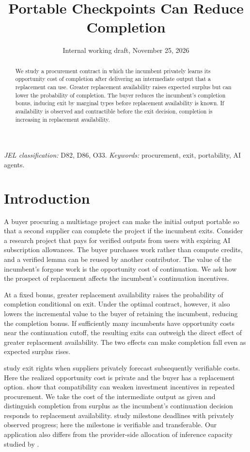 \documentclass[11pt]{article}
\title{Portable Checkpoints Can Reduce Completion}
\author{}
\date{Internal working draft, November 25, 2026}
\begin{document}
\maketitle
\begin{abstract}
We study a procurement contract in which the incumbent privately learns its opportunity cost of completion after delivering an intermediate output that a replacement can use. Greater replacement availability raises expected surplus but can lower the probability of completion. The buyer reduces the incumbent's completion bonus, inducing exit by marginal types before replacement availability is known. If availability is observed and contractible before the exit decision, completion is increasing in replacement availability.
\end{abstract}
\noindent\textit{JEL classification:} D82, D86, O33.\quad
\textit{Keywords:} procurement, exit, portability, AI agents.

\section{Introduction}
A buyer procuring a multistage project can make the initial output portable so that a second supplier can complete the project if the incumbent exits. Consider a research project that pays for verified outputs from users with expiring AI subscription allowances. The buyer purchases work rather than compute credits, and a verified lemma can be reused by another contributor. The value of the incumbent's forgone work is the opportunity cost of continuation. We ask how the prospect of replacement affects the incumbent's continuation incentives.

At a fixed bonus, greater replacement availability raises the probability of completion conditional on exit. Under the optimal contract, however, it also lowers the incremental value to the buyer of retaining the incumbent, reducing the completion bonus. If sufficiently many incumbents have opportunity costs near the continuation cutoff, the resulting exits can outweigh the direct effect of greater replacement availability. The two effects can make completion fall even as expected surplus rises.

\citet{andrade} study exit rights when suppliers privately forecast subsequently verifiable costs. Here the realized opportunity cost is private and the buyer has a replacement option. \citet{hanazono} show that compatibility can weaken investment incentives in repeated procurement. We take the cost of the intermediate output as given and distinguish completion from surplus as the incumbent's continuation decision responds to replacement availability. \citet{green} study milestone deadlines with privately observed progress; here the milestone is verifiable and transferable. Our application also differs from the provider-side allocation of inference capacity studied by \citet{zhu}.
\end{document}
